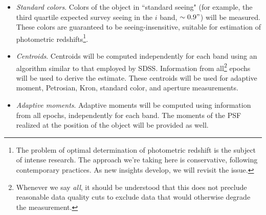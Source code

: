 \documentclass[12pt]{article}
\begin{document}
\begin{itemize}
In addition to the maximum likelihood values of fitted parameters and their covariance matrix, a number (currently planned to be $\sim 200$, on average\footnote{This choice of the number of independent samples will be verified during Construction.}) of independent samples from the likelihood function will be provided. These will enable use-cases sensitive to departures from the Gaussian approximation, with shear measurement being the primary use case. A permissible descope, in case of insufficient storage, will be not to sample the posterior for u and y bands.

    \item {\em Standard colors}. Colors of the object in ``standard seeing" (for example, the third quartile expected survey seeing in the $i$ band, $\sim 0.9"$) will be measured. These colors are guaranteed to be seeing-insensitive,  suitable for estimation of photometric redshifts\footnote{The problem of optimal determination of photometric redshift is the subject of intense research. The approach we're taking here is conservative, following contemporary practices. As new insights develop, we will revisit the issue.}.

    \item {\em Centroids}. Centroids will be computed independently for each band using an algorithm similar to that employed by SDSS. Information from all\footnote{Whenever we say {\em all}, it should be understood that this does not preclude reasonable data quality cuts to exclude data that would otherwise degrade the measurement.} epochs will be used to derive the estimate. These centroids will be used for adaptive moment, Petrosian, Kron, standard color, and aperture measurements.

    \item {\em Adaptive moments}. Adaptive moments will be computed using information from all epochs, independently for each band. The moments of the PSF realized at the position of the object will be provided as well.


\end{itemize}
\end{document}
